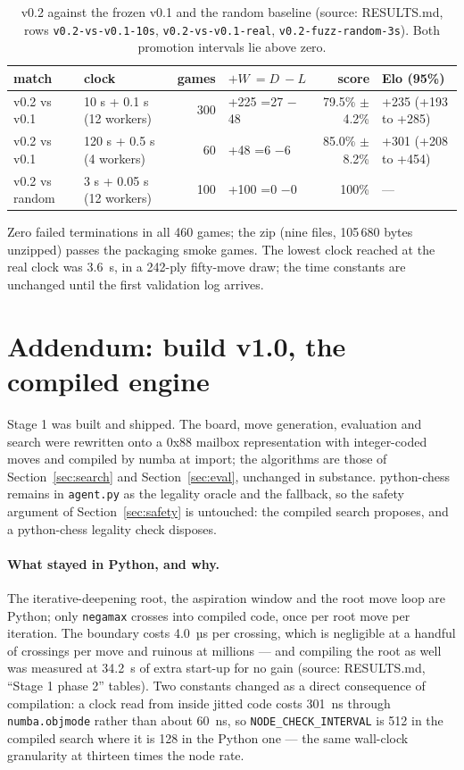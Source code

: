 \documentclass[11pt,a4paper]{article}
\newcommand{\src}[1]{{\small(source: #1)}}
\newcommand{\code}[1]{\texttt{#1}}
\begin{document}
\begin{table}[H]\centering\small
\begin{tabular}{llrlrl}
\toprule
match & clock & games & $+W\ =D\ -L$ & score & Elo (95\%) \\
\midrule
v0.2 vs v0.1 & 10 s + 0.1 s (12 workers) & 300 & +225 =27 $-$48 & 79.5\% $\pm$ 4.2\% & +235 (+193 to +285) \\
v0.2 vs v0.1 & 120 s + 0.5 s (4 workers) & 60 & +48 =6 $-$6 & 85.0\% $\pm$ 8.2\% & +301 (+208 to +454) \\
v0.2 vs random & 3 s + 0.05 s (12 workers) & 100 & +100 =0 $-$0 & 100\% & --- \\
\bottomrule
\end{tabular}
\caption{v0.2 against the frozen v0.1 and the random baseline \src{RESULTS.md, rows \code{v0.2-vs-v0.1-10s}, \code{v0.2-vs-v0.1-real}, \code{v0.2-fuzz-random-3s}}. Both promotion intervals lie above zero.}
\end{table}

Zero failed terminations in all 460 games; the zip (nine files, 105\,680 bytes unzipped) passes
the packaging smoke games. The lowest clock reached at the real clock was 3.6~s, in a 242-ply
fifty-move draw; the time constants are unchanged until the first validation log arrives.

\section*{Addendum: build v1.0, the compiled engine}
Stage 1 was built and shipped. The board, move generation, evaluation and search were rewritten onto a
0x88 mailbox representation with integer-coded moves and compiled by numba at import; the algorithms are
those of Section~\ref{sec:search} and Section~\ref{sec:eval}, unchanged in substance. python-chess remains
in \code{agent.py} as the legality oracle and the fallback, so the safety argument of
Section~\ref{sec:safety} is untouched: the compiled search proposes, and a python-chess legality check
disposes.

\paragraph{What stayed in Python, and why.} The iterative-deepening root, the aspiration window and the
root move loop are Python; only \code{negamax} crosses into compiled code, once per root move per
iteration. The boundary costs 4.0~µs per crossing, which is negligible at a handful of crossings per move
and ruinous at millions --- and compiling the root as well was measured at 34.2~s of extra start-up for no
gain \src{RESULTS.md, ``Stage 1 phase 2'' tables}. Two constants changed as a direct consequence of
compilation: a clock read from inside jitted code costs 301~ns through \code{numba.objmode} rather than
about 60~ns, so \code{NODE\_CHECK\_INTERVAL} is 512 in the compiled search where it is 128 in the Python
one --- the same wall-clock granularity at thirteen times the node rate.
\end{document}
